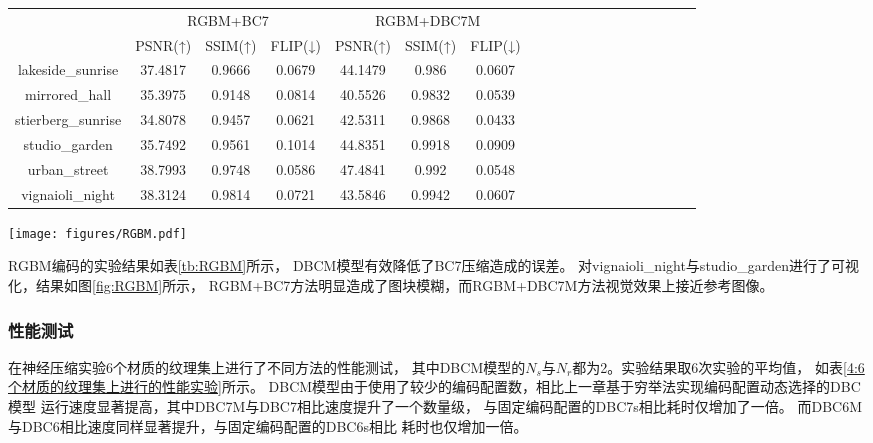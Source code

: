 \begin{table*}[htbp]
    \caption{6个HDR图像上进行的对比实验}
    \label{tb:RGBM}
    \begin{center}
    \begin{tabular}{ccccccccccccccccccc}
    \toprule
                    & \multicolumn{3}{c}{RGBM+BC7}  & \multicolumn{3}{c}{RGBM+DBC7M}  \\ 
                    & PSNR(↑)   & SSIM(↑) & FLIP(↓)&PSNR(↑)& SSIM(↑) & FLIP(↓) \\
    \midrule
lakeside\_sunrise    & 37.4817   & 0.9666 & 0.0679 &44.1479&0.986&0.0607 \\
mirrored\_hall       & 35.3975   & 0.9148 & 0.0814 &40.5526&0.9832&0.0539 \\
stierberg\_sunrise   & 34.8078   & 0.9457 & 0.0621 &42.5311&0.9868&0.0433 \\
studio\_garden       & 35.7492   & 0.9561 & 0.1014 &44.8351&0.9918&0.0909 \\
urban\_street        & 38.7993   & 0.9748 & 0.0586 &47.4841&0.992&0.0548 \\
vignaioli\_night     & 38.3124   & 0.9814 & 0.0721 &43.5846&0.9942&0.0607 \\
    \bottomrule
    \end{tabular}
    \end{center}
\end{table*}

\begin{figure*}[htbp]
    \centering
    \texttt{[image: figures/RGBM.pdf]}
    \caption{两个HDR纹理的可视化实验}
    \label{fig:RGBM} 
\end{figure*}

RGBM编码的实验结果如表\ref{tb:RGBM}所示，
DBCM模型有效降低了BC7压缩造成的误差。
对vignaioli\_night与studio\_garden进行了可视化，结果如图\ref{fig:RGBM}所示，
RGBM+BC7方法明显造成了图块模糊，而RGBM+DBC7M方法视觉效果上接近参考图像。


\subsubsection{性能测试}

在神经压缩实验6个材质的纹理集上进行了不同方法的性能测试，
其中DBCM模型的$N_s$与$N_r$都为2。实验结果取6次实验的平均值，
如表\ref{4:6个材质的纹理集上进行的性能实验}所示。
DBCM模型由于使用了较少的编码配置数，相比上一章基于穷举法实现编码配置动态选择的DBC模型
运行速度显著提高，其中DBC7M与DBC7相比速度提升了一个数量级，
与固定编码配置的DBC7s相比耗时仅增加了一倍。
而DBC6M与DBC6相比速度同样显著提升，与固定编码配置的DBC6s相比
耗时也仅增加一倍。

